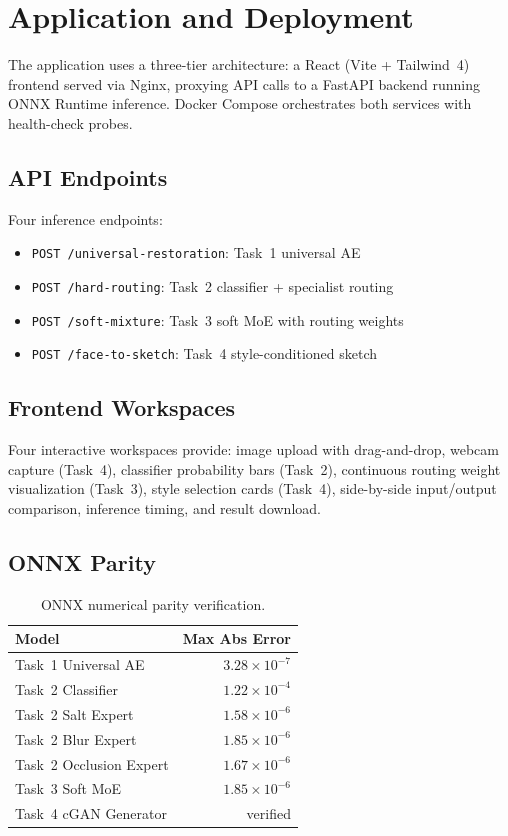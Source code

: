 \documentclass[conference]{IEEEtran}
\begin{document}
\section{Application and Deployment}

The application uses a three-tier architecture: a React (Vite + Tailwind~4) frontend served via Nginx, proxying API calls to a FastAPI backend running ONNX Runtime inference. Docker Compose orchestrates both services with health-check probes.

\subsection{API Endpoints}
Four inference endpoints:
\begin{itemize}
\item \texttt{POST /universal-restoration}: Task~1 universal AE
\item \texttt{POST /hard-routing}: Task~2 classifier + specialist routing
\item \texttt{POST /soft-mixture}: Task~3 soft MoE with routing weights
\item \texttt{POST /face-to-sketch}: Task~4 style-conditioned sketch
\end{itemize}

\subsection{Frontend Workspaces}
Four interactive workspaces provide: image upload with drag-and-drop, webcam capture (Task~4), classifier probability bars (Task~2), continuous routing weight visualization (Task~3), style selection cards (Task~4), side-by-side input/output comparison, inference timing, and result download.

\subsection{ONNX Parity}
\begin{table}[h]
\centering
\caption{ONNX numerical parity verification.}
\label{tab:onnx}
\begin{tabular}{@{}lr@{}}
\toprule
\textbf{Model} & \textbf{Max Abs Error} \\
\midrule
Task~1 Universal AE & $3.28 \times 10^{-7}$ \\
Task~2 Classifier & $1.22 \times 10^{-4}$ \\
Task~2 Salt Expert & $1.58 \times 10^{-6}$ \\
Task~2 Blur Expert & $1.85 \times 10^{-6}$ \\
Task~2 Occlusion Expert & $1.67 \times 10^{-6}$ \\
Task~3 Soft MoE & $1.85 \times 10^{-6}$ \\
Task~4 cGAN Generator & verified \\
\bottomrule
\end{tabular}
\end{table}
\end{document}
